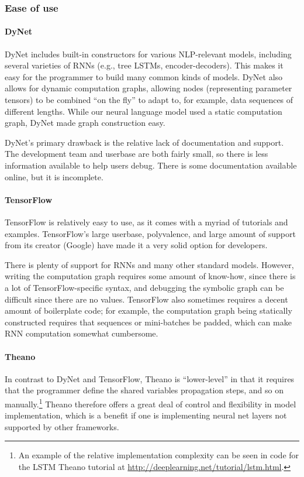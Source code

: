 \documentclass{article}
\begin{document}
\subsubsection{Ease of use}

\paragraph{DyNet}
DyNet includes built-in constructors for various NLP-relevant models, including several varieties of RNNs (e.g., tree LSTMs, encoder-decoders). This makes it easy for the programmer to build many common kinds of models. DyNet also allows for dynamic computation graphs, allowing nodes (representing parameter tensors) to be combined ``on the fly'' to adapt to, for example, data sequences of different lengths. While our neural language model used a static computation graph, DyNet made graph construction easy.

DyNet's primary drawback is the relative lack of documentation and support. The development team and userbase are both fairly small, so there is less information available to help users debug. There is some documentation available online, but it is incomplete.

\paragraph{TensorFlow} TensorFlow is relatively easy to use, as it comes with a myriad of tutorials and examples. TensorFlow's large userbase, polyvalence, and large amount of support from its creator (Google) have made it a very solid option for developers.

There is plenty of support for RNNs and many other standard models. However, writing the computation graph requires some amount of know-how, since there is a lot of TensorFlow-specific syntax, and debugging the symbolic graph can be difficult since there are no values. TensorFlow also sometimes requires a decent amount of boilerplate code; for example, the computation graph being statically constructed requires that sequences or mini-batches be padded, which can make RNN computation somewhat cumbersome.

\paragraph{Theano}
In contrast to DyNet and TensorFlow, Theano is ``lower-level'' in that it requires that the programmer define the shared variables propagation steps, and so on manually.\footnote{An example of the relative implementation complexity can be seen in code for the LSTM Theano tutorial at \url{http://deeplearning.net/tutorial/lstm.html}.} Theano therefore offers a great deal of control and flexibility in model implementation, which is a benefit if one is implementing neural net layers not supported by other frameworks.
\end{document}
